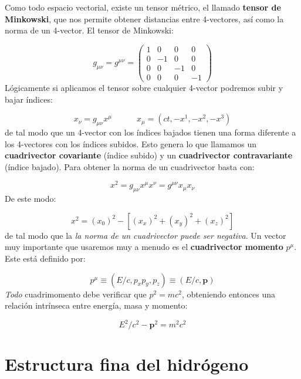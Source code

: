 \documentclass[12pt,a4paper]{article}
\numberwithin{equation}{section}
\numberwithin{figure}{section}
\newcommand{\tquad}{\quad \quad \quad}
\newcommand{\pn}{\mathbf{p}}
\begin{document}
Como todo espacio vectorial, existe un tensor métrico, el llamado \textbf{tensor de Minkowski}, que nos permite obtener distancias entre 4-vectores, así como la norma de un 4-vector. El tensor de Minkowski:

\begin{equation}
    g_{\mu \nu} = g^{\mu \nu} = \begin{pmatrix}
        1 & 0 & 0 & 0 \\
        0 & -1 & 0 & 0 \\
        0 & 0 & -1 & 0 \\
        0 & 0 & 0 & -1 
    \end{pmatrix}
\end{equation}
Lógicamente si aplicamos el tensor sobre cualquier 4-vector podremos subir y bajar índices: 

\begin{equation}
    x_{\nu} = g_{\mu \nu} x^{\mu} \tquad x_{\mu} = (ct, -x^1, -x^2, -x^3)
\end{equation}
de tal modo que un 4-vector con los índices bajados tienen una forma diferente a los 4-vectores con los índices subidos. Esto genera lo que llamamos un \textbf{cuadrivector covariante} (índice subido) y un \textbf{cuadrivector contravariante} (índice bajado). Para obtener la norma de un cuadrivector basta con:

\begin{equation}
    x^2 = g_{\mu \nu} x^{\mu} x^{\nu} = g^{\mu \nu} x_{\mu} x_{\nu}
\end{equation}
De este modo:

\begin{equation}
    x^2 = (x_0)^2 - [(x_x)^2 + (x_y)^2 +(x_z)^2 ]
\end{equation}
de tal modo que la \textit{la norma de un cuadrivector puede ser negativa}. Un vector muy importante que usaremos muy a menudo es el \textbf{cuadrivector momento} $p^\mu$. Este está definido por:

\begin{equation}
    p^{\mu} \equiv (E/c, p_x p_y, p_z) \equiv (E/c, \pn)
\end{equation}
\textit{Todo} cuadrimomento debe verificar que $p^2=mc^2$, obteniendo entonces una relación intrínseca entre energía, masa y momento:

\begin{equation}
    E^2/c^2 - \pn^2 = m^2 c^2
\end{equation}


\section{Estructura fina del hidrógeno}
\end{document}

